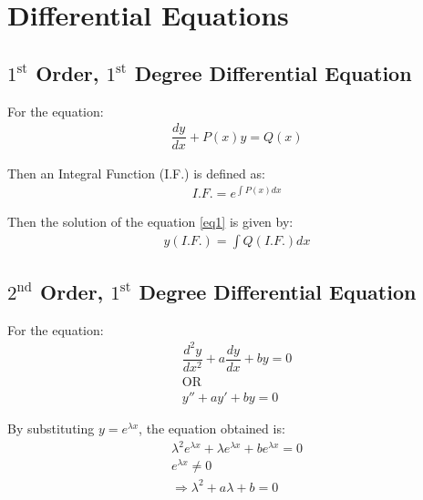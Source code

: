\documentclass[../main.tex]{subfile}
\begin{document}
    \chapter{Differential Equations}
    \section{$1^\text{st}$ Order, $1^\text{st}$ Degree Differential Equation}
        For the equation:
        \begin{align}
        \dfrac{dy}{dx}+P(x)y=Q(x)\label{eq1}
        \end{align}

        Then an Integral Function (I.F.) is defined as:
        \begin{align}
        I.F.=e^{\int P(x)dx}
        \end{align}

        Then the solution of the equation \ref{eq1} is given by:
        \begin{align}
        y(I.F.)=\int Q (I.F.) dx
        \end{align}

        \section{$2^\text{nd}$ Order, $1^\text{st}$ Degree Differential Equation}
        For the equation:
        \begin{align}
            \dfrac{d^2 y}{dx^2} + a\dfrac{dy}{dx} + by = 0 \label{eq2}\\
            \text{OR} \nonumber \\
            y'' + ay' + by = 0
        \end{align}

        By substituting $y=e^{\lambda x}$, the equation obtained is:
        \begin{align}
            \lambda^2 e^{\lambda x} + \lambda e^{\lambda x} + b e^{\lambda x} = 0 \nonumber\\
            e^{\lambda x} \neq 0 \nonumber\\
            \Rightarrow \lambda^2 + a\lambda + b = 0 \label{eq3}
        \end{align}
\end{document}
